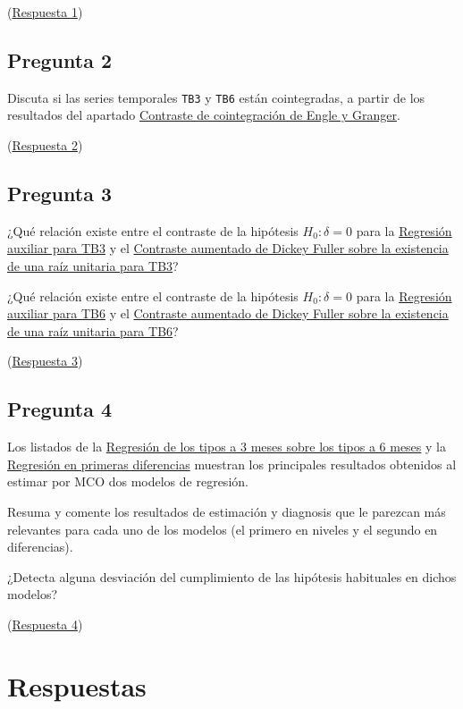 \documentclass[10pt]{article}
\begin{document}
(\hyperref[sec:org065ed06]{Respuesta 1})
\subsection*{Pregunta 2}
\label{sec:org90607d1}

Discuta si las series temporales \texttt{TB3} y \texttt{TB6} están cointegradas, a
partir de los resultados del apartado \hyperref[sec:org4a0caf1]{Contraste de cointegración de Engle y Granger}.

(\hyperref[sec:orga3ba9ba]{Respuesta 2})
\subsection*{Pregunta 3}
\label{sec:org5960aaa}

¿Qué relación existe entre el contraste de la hipótesis \(H_0: \delta =
0\) para la \hyperref[sec:org8ca14f3]{Regresión auxiliar para TB3} y el \hyperref[sec:orgcf37992]{Contraste aumentado de Dickey Fuller sobre la existencia de una raíz unitaria para TB3}?

¿Qué relación existe entre el contraste de la hipótesis \(H_0: \delta =
0\) para la \hyperref[sec:org614118e]{Regresión auxiliar para TB6} y el \hyperref[sec:orgf4185fd]{Contraste aumentado de Dickey Fuller sobre la existencia de una raíz unitaria para TB6}?

(\hyperref[sec:org6956953]{Respuesta 3})
\subsection*{Pregunta 4}
\label{sec:org1464cae}

Los listados de la \hyperref[sec:org6fc9b76]{Regresión de los tipos a 3 meses sobre los tipos a 6 meses} y la \hyperref[sec:org752efb0]{Regresión en primeras diferencias} muestran los
principales resultados obtenidos al estimar por MCO dos modelos de
regresión.

Resuma y comente los resultados de estimación y diagnosis que le
parezcan más relevantes para cada uno de los modelos (el primero en
niveles y el segundo en diferencias).

¿Detecta alguna desviación del cumplimiento de las hipótesis
habituales en dichos modelos?

(\hyperref[sec:org0e7c6d9]{Respuesta 4})

\newpage
\section*{Respuestas}
\label{sec:orgfb36878}
\end{document}
